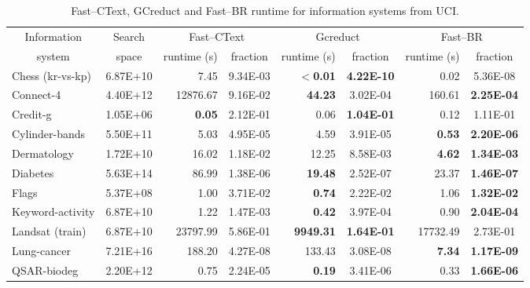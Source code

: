 \documentclass[number,preprint,review,12pt]{elsarticle}
\begin{document}
	\begin{table}[!htb]
		\centering \scriptsize 
		\caption{Fast--CText, GCreduct and Fast--BR runtime for information systems from UCI.}
		\label{tab:java}
		\begin{tabular}{|l|c|r|c|r|c|r|c|}
			\hline
			\multicolumn{1}{|c|}{Information}  & Search &\multicolumn{2}{c|}{Fast--CText} & \multicolumn{2}{c|}{Gcreduct} & \multicolumn{2}{c|}{Fast--BR}  \\
			\cline{3-8}
			\multicolumn{1}{|c|}{system} & space & runtime (s) & fraction & runtime (s)  & fraction & runtime (s) & fraction \\
			\hline
			Chess (kr-vs-kp) & 6.87E+10 & 7.45          & 9.34E-03 & \textbf{$<$0.01} & \textbf{4.22E-10} & 0.02            & 5.36E-08          \\
			Connect-4        & 4.40E+12 & 12876.67      & 9.16E-02 & \textbf{44.23}   & 3.02E-04          & 160.61          & \textbf{2.25E-04} \\
			Credit-g         & 1.05E+06 & \textbf{0.05} & 2.12E-01 & 0.06             & \textbf{1.04E-01} & 0.12            & 1.11E-01          \\
			Cylinder-bands   & 5.50E+11 & 5.03          & 4.95E-05 & 4.59             & 3.91E-05          & \textbf{0.53}   & \textbf{2.20E-06} \\
			Dermatology      & 1.72E+10 & 16.02         & 1.18E-02 & 12.25            & 8.58E-03          & \textbf{4.62}   & \textbf{1.34E-03} \\
			Diabetes         & 5.63E+14 & 86.99         & 1.38E-06 & \textbf{19.48}   & 2.52E-07          & 23.37           & \textbf{1.46E-07} \\
			Flags            & 5.37E+08 & 1.00          & 3.71E-02 & \textbf{0.74}    & 2.22E-02          & 1.06            & \textbf{1.32E-02} \\
			Keyword-activity & 6.87E+10 & 1.22          & 1.47E-03 & \textbf{0.42}    & 3.97E-04          & 0.90            & \textbf{2.04E-04} \\
			Landsat (train)  & 6.87E+10 & 23797.99      & 5.86E-01 & \textbf{9949.31} & \textbf{1.64E-01} & 17732.49        & 2.73E-01          \\
			Lung-cancer      & 7.21E+16 & 188.20        & 4.27E-08 & 133.43           & 3.08E-08          & \textbf{7.34}   & \textbf{1.17E-09} \\
			QSAR-biodeg      & 2.20E+12 & 0.75          & 2.24E-05 & \textbf{0.19}    & 3.41E-06          & 0.33            & \textbf{1.66E-06} \\

\end{tabular}
\end{table}
\end{document}
